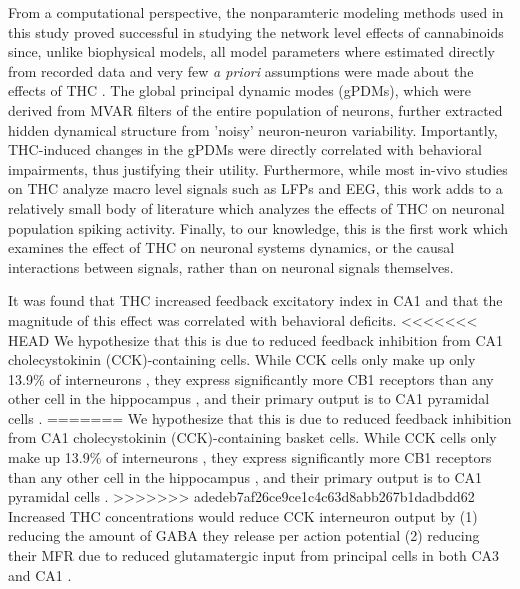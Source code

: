 \documentclass[11pt,a4paper,final]{article}
\begin{document}
From a computational perspective, the nonparamteric modeling methods used in this study proved successful in studying the network level effects of cannabinoids since, unlike biophysical models, all model parameters where estimated directly from recorded data and very few \textit{a priori} assumptions were made about the effects of THC \citep{marm04,song09par1,sandler15}.
The global principal dynamic modes (gPDMs), which were derived from MVAR filters of the entire population of neurons, further extracted hidden dynamical structure from 'noisy' neuron-neuron variability.
Importantly, THC-induced changes in the gPDMs were directly correlated with behavioral impairments, thus justifying their utility.
Furthermore, while most in-vivo studies on THC analyze macro level signals such as LFPs and EEG, this work adds to a relatively small body of literature which analyzes the effects of THC on neuronal population spiking activity.
Finally, to our knowledge, this is the first work which examines the effect of THC on neuronal systems dynamics, or the causal interactions between signals, rather than on neuronal signals themselves.

It was found that THC increased feedback excitatory index in CA1 and that the magnitude of this effect was correlated with behavioral deficits. 
<<<<<<< HEAD
We hypothesize that this is due to reduced feedback inhibition from CA1 cholecystokinin (CCK)-containing cells.
While CCK cells only make up only 13.9\% of interneurons \citep{bezaire13}, they express significantly more CB1 receptors than any other cell in the hippocampus \citep{katona00}, and their primary output is to CA1 pyramidal cells \citep{bezaire13}.
=======
We hypothesize that this is due to reduced feedback inhibition from CA1 cholecystokinin (CCK)-containing basket cells.
While CCK cells only make up 13.9\% of interneurons \citep{bezaire13}, they express significantly more CB1 receptors than any other cell in the hippocampus \citep{katona00}, and their primary output is to CA1 pyramidal cells \citep{bezaire13}.
>>>>>>> adedeb7af26ce9ce1c4c63d8abb267b1dadbdd62
Increased THC concentrations would reduce CCK interneuron output by (1) reducing the amount of GABA they release per action potential (2) reducing their MFR due to reduced glutamatergic input from principal cells in both CA3 and CA1 \citep{gulyas04,lee10}.
\end{document}
